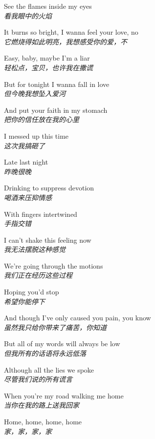 \begin{spacing}{1.5}
\begin{flushleft}
See the flames inside my eyes\\
\textit{看我眼中的火焰}\lyricspace

It burns so bright, I wanna feel your love, no\\
\textit{它燃烧得如此明亮，我想感受你的爱，不}\lyricspace

Easy, baby, maybe I'm a liar\\
\textit{轻松点，宝贝，也许我在撒谎}\lyricspace

But for tonight I wanna fall in love\\
\textit{但今晚我想坠入爱河}\lyricspace

And put your faith in my stomach\\
\textit{把你的信任放在我的心里}\lyricspace

I messed up this time\\
\textit{这次我搞砸了}\lyricspace

Late last night\\
\textit{昨晚很晚}\lyricspace

Drinking to suppress devotion\\
\textit{喝酒来压抑情感}\lyricspace

With fingers intertwined\\
\textit{手指交错}\lyricspace

I can't shake this feeling now\\
\textit{我无法摆脱这种感觉}\lyricspace

We're going through the motions\\
\textit{我们正在经历这些过程}\lyricspace

Hoping you'd stop\\
\textit{希望你能停下}\lyricspace

And though I've only caused you pain, you know\\
\textit{虽然我只给你带来了痛苦，你知道}\lyricspace

But all of my words will always be low\\
\textit{但我所有的话语将永远低落}\lyricspace

Although all the lies we spoke\\
\textit{尽管我们说的所有谎言}\lyricspace

When you're my road walking me home\\
\textit{当你在我的路上送我回家}\lyricspace

Home, home, home, home\\
\textit{家，家，家，家}\lyricspace


\end{flushleft}
\end{spacing}
